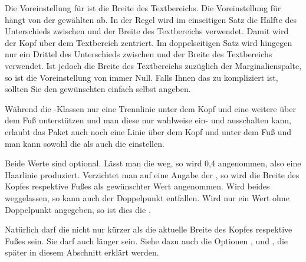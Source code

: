 Die Voreinstellung für  ist die Breite des Textbereichs. Die
Voreinstellung für  hängt von der gewählten 
ab. In der Regel wird im einseitigen Satz die Hälfte des Unterschieds zwischen
 und der Breite des Textbereichs verwendet. Damit wird der Kopf
über dem Textbereich zentriert. Im doppelseitigen Satz wird hingegen nur ein
Drittel des Unterschieds zwischen  und der Breite des
Textbereichs verwendet. Ist  jedoch die Breite des Textbereichs
zuzüglich der Marginalienspalte, so ist die Voreinstellung von 
immer Null. Falls Ihnen das zu kompliziert ist, sollten Sie den gewünschten
 einfach selbst angeben.%
\EndIndexGroup

\iffree{}{\clearpage}%


\begin{Declaration}
\end{Declaration}
%
%
%
%
Während die \KOMAScript-Klassen nur eine Trennlinie unter dem Kopf und eine
weitere über dem Fuß unterstützen und man diese nur wahlweise ein- und
ausschalten kann, erlaubt das Paket  auch noch eine
Linie über dem Kopf und unter dem Fuß und man kann sowohl
die  als auch die  einstellen.

Beide Werte sind optional. Lässt man die  weg, so wird
0,4 angenommen, also eine Haarlinie produziert. Verzichtet man auf
eine Angabe der , so wird die Breite des Kopfes respektive
Fußes als gewünschter Wert angenommen. Wird beides weggelassen, so kann auch
der Doppelpunkt entfallen. Wird nur ein Wert ohne Doppelpunkt angegeben, so
ist dies die .

Natürlich darf die  nicht nur kürzer als die aktuelle Breite des
Kopfes respektive Fußes sein. Sie darf auch länger sein. Siehe dazu auch
die Optionen %
,
 und
, die später in diesem
Abschnitt erklärt werden.

